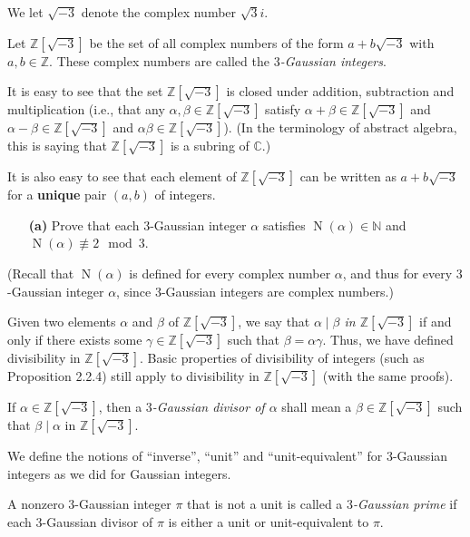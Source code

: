 \documentclass[paper=a4, fontsize=12pt]{scrartcl} %
\newcommand{\CC}{\mathbb{C}} %
\newcommand{\NN}{\mathbb{N}} %
\newcommand{\ZZ}{\mathbb{Z}} %
\newcommand{\tup}[1]{\left( #1 \right)}
\newcommand{\ive}[1]{\left[ #1 \right]}
\newcommand{\N}{\operatorname{N}} %
\theoremstyle{plainsl}
\theoremstyle{definition}
\theoremstyle{remark}
\begin{document}
We let $\sqrt{-3}$ denote the complex number $\sqrt3 i$.

Let $\ZZ\ive{\sqrt{-3}}$ be the set of all complex numbers
of the form $a + b \sqrt{-3}$ with $a, b \in \ZZ$.
These complex numbers are called the
\textit{$3$-Gaussian integers}.

It is easy to see that the set $\ZZ\ive{\sqrt{-3}}$
is closed under addition, subtraction and multiplication
(i.e., that any $\alpha, \beta \in \ZZ\ive{\sqrt{-3}}$ satisfy
$\alpha + \beta \in \ZZ\ive{\sqrt{-3}}$ and
$\alpha - \beta \in \ZZ\ive{\sqrt{-3}}$ and
$\alpha \beta \in \ZZ\ive{\sqrt{-3}}$).
(In the terminology of abstract algebra, this is saying
that $\ZZ\ive{\sqrt{-3}}$ is a subring of $\CC$.)

It is also easy to see that each element of $\ZZ\ive{\sqrt{-3}}$
can be written as $a + b \sqrt{-3}$ for a \textbf{unique} pair
$\tup{a, b}$ of integers.

\begin{enumerate}

\item[\textbf{(a)}]
Prove that each $3$-Gaussian integer $\alpha$ satisfies
$\N\tup{\alpha} \in \NN$ and
$\N\tup{\alpha} \not\equiv 2 \mod 3$.

\end{enumerate}

\noindent
(Recall that $\N\tup{\alpha}$ is defined for every complex
number $\alpha$, and thus for every $3$-Gaussian integer
$\alpha$, since $3$-Gaussian integers are complex numbers.)

Given two elements $\alpha$ and $\beta$ of $\ZZ\ive{\sqrt{-3}}$,
we say that \textit{$\alpha \mid \beta$ in $\ZZ\ive{\sqrt{-3}}$}
if and only if there exists some $\gamma \in \ZZ\ive{\sqrt{-3}}$
such that $\beta = \alpha \gamma$.
Thus, we have defined divisibility in $\ZZ\ive{\sqrt{-3}}$.
Basic properties of divisibility of integers (such as
Proposition 2.2.4) still apply
to divisibility in $\ZZ\ive{\sqrt{-3}}$ (with the same proofs).

If $\alpha \in \ZZ\ive{\sqrt{-3}}$, then a
\textit{$3$-Gaussian divisor of $\alpha$} shall mean a
$\beta \in \ZZ\ive{\sqrt{-3}}$ such that $\beta \mid \alpha$
in $\ZZ\ive{\sqrt{-3}}$.

We define the notions of ``inverse'', ``unit'' and
``unit-equivalent'' for $3$-Gaussian integers
as we did for Gaussian integers.

A nonzero $3$-Gaussian integer $\pi$ that is not a unit is
called a \textit{$3$-Gaussian prime} if each $3$-Gaussian
divisor of $\pi$ is either a unit or unit-equivalent to $\pi$.
\end{document}
